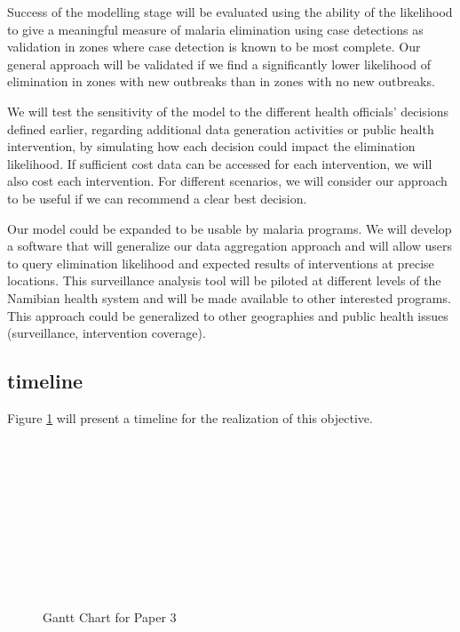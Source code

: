 \documentclass[a4paper,11pt,draft,twoside]{article}
\begin{document}
Success of the modelling stage will be evaluated using the ability of the likelihood to give a meaningful measure of malaria elimination using case detections as validation in zones where case detection is known to be most complete. Our general approach will be validated if we find a significantly lower likelihood of elimination in zones with new outbreaks than in zones with no new outbreaks.

We will test the sensitivity of the model to the different health officials’ decisions defined earlier, regarding additional data generation activities or public health intervention, by simulating how each decision could impact the elimination likelihood. If sufficient cost data can be accessed for each intervention, we will also cost each intervention. For different scenarios, we will consider our approach to be useful if we can recommend a clear best decision.

Our model could be expanded to be usable by malaria programs. We will develop a software that will generalize our data aggregation approach and will allow users to query elimination likelihood and expected results of interventions at precise locations. This surveillance analysis tool will be piloted at different levels of the Namibian health system and will be made available to other interested programs. This approach could be generalized to other geographies and public health issues (surveillance, intervention coverage).


\subsection{timeline}

Figure \ref{Gantt3} will present a timeline for the realization of this objective.

\begin{figure}[h]
\begin{ganttchart}{1}{24}
 \\
 \\
 \\
 \\
 \\
 \\
 \\
 \\
 \\
\end{ganttchart}
\caption{Gantt Chart for Paper 3}
\label{Gantt3}
\end{figure}
\end{document}
